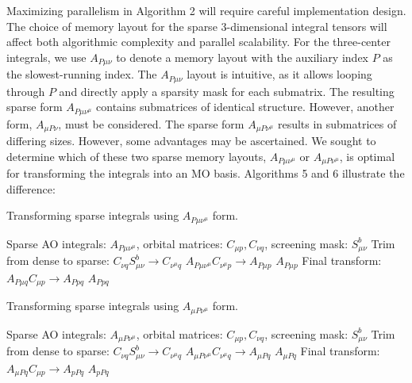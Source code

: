 Maximizing parallelism in Algorithm 2 will require careful implementation design. 
The choice of memory layout for the sparse 3-dimensional integral tensors will affect both algorithmic 
complexity and parallel scalability. For the three-center integrals, we use $A_{P\mu \nu}$ to denote a memory 
layout with the auxiliary index $P$ as the slowest-running index. 
The $A_{P \mu \nu}$ layout is intuitive, as it allows looping through $P$ and directly apply a sparsity mask 
for each submatrix. The resulting sparse form $A_{P \mu \nu^\mu}$ contains submatrices of identical structure.
However, another form, $A_{\mu P \nu}$, must be considered. The sparse form $A_{\mu P \nu^\mu}$
results in submatrices of differing sizes. However, some advantages may be ascertained.
We sought to determine which of these two sparse memory layouts, $A_{P \mu \nu^\mu}$ or 
$A_{\mu P \nu^\mu}$, is optimal for transforming the integrals into an MO basis.
Algorithms 5 and 6 illustrate the difference:

\begin{algorithm}[H]
\caption{Transforming sparse integrals using $A_{P \mu \nu^\mu}$ form.}
\begin{algorithmic}
\REQUIRE Sparse AO integrals: $A_{P \mu \nu^\mu}$, orbital matrices: $C_{\mu p}, C_{\nu q}$, screening mask: $S_{\mu \nu}^b$
    \STATE Trim from dense to sparse: $C_{\nu q}S_{\mu \nu}^b \rightarrow C_{\nu^{\mu} q}$
    \STATE $A_{P \mu \nu^\mu} C_{\nu^{\mu} p} \rightarrow A_{P \mu p}$
\ENDFOR
\RETURN $A_{P \mu p}$
\STATE Final transform: $A_{P \mu q}C_{\mu p} \rightarrow A_{P p q}$
\RETURN $A_{P p q}$
\end{algorithmic}
\end{algorithm}

\begin{algorithm}[H]
\caption{Transforming sparse integrals using $A_{\mu P \nu^\mu}$ form.}
\begin{algorithmic}
\REQUIRE Sparse AO integrals: $A_{\mu P \nu^\mu}$, orbital matrices: $C_{\mu p}, C_{\nu q}$, screening mask: $S_{\mu \nu}^b$
    \STATE Trim from dense to sparse: $C_{\nu q}S_{\mu \nu}^b \rightarrow C_{\nu^{\mu} q}$
    \STATE $A_{\mu P \nu^{\mu}} C_{\nu^{\mu} q} \rightarrow A_{\mu Pq}$
\ENDFOR
\RETURN $A_{\mu P q}$
\STATE Final transform: $A_{\mu P q}C_{\mu p} \rightarrow A_{p P q}$
\RETURN $A_{p P q}$
\end{algorithmic}
\end{algorithm}


